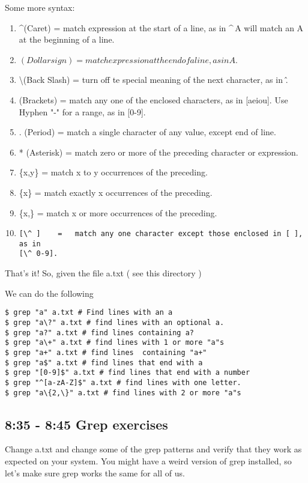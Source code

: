 \documentclass[12pt,a4paper]{article}
\begin{document}
Some more syntax:
\begin{enumerate}
\item \textasciicircum (Caret)   =   match expression at the start of a line, as
in \textasciicircum\,A will match an A at the beginning of a line.
\item $ (Dollar sign)    =   match expression at the end of a line, as in A$.
\item \textbackslash (Back Slash)  =   turn off te special meaning of the next character, as in \^.
\item [ ] (Brackets)  =   match any one of the enclosed characters, as in [aeiou]. Use Hyphen "-" for a range, as in [0-9].
\item . (Period)  =   match a single character of any value, except end of line.
\item * (Asterisk)    =   match zero or more of the preceding character or expression.
\item \{x,y\} =   match x to y occurrences of the preceding.
\item \{x\}   =   match exactly x occurrences of the preceding.
\item  \{x,\}  =   match x or more occurrences of the preceding.
\item \begin{verbatim}[\^ ]    =   match any one character except those enclosed in [ ], as in
[\^ 0-9].\end{verbatim}
\end{enumerate}

That's it! So, given the file a.txt ( see this directory )

We can do the following

\begin{lstlisting}[style=term]
$ grep "a" a.txt # Find lines with an a
$ grep "a\?" a.txt # find lines with an optional a.
$ grep "a?" a.txt # find lines containing a?
$ grep "a\+" a.txt # find lines with 1 or more "a"s
$ grep "a+" a.txt # find lines  containing "a+" 
$ grep "a$" a.txt # find lines that end with a
$ grep "[0-9]$" a.txt # find lines that end with a number
$ grep "^[a-zA-Z]$" a.txt # find lines with one letter.
$ grep "a\{2,\}" a.txt # find lines with 2 or more "a"s
\end{lstlisting}


\subsection{ 8:35 - 8:45 Grep exercises } 
Change a.txt and change some of the grep patterns and verify that they work as expected on your system. You might have a weird version of grep installed, so let's make sure grep works the same for all of us.
\end{document}
